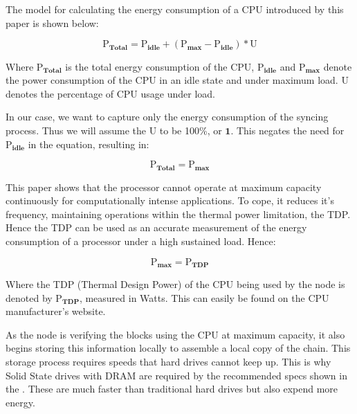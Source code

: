 The model for calculating the energy consumption of a CPU introduced by this paper \cite{SaingreUnderstandingContracts} is shown below:

\begin{equation*}
    \boldsymbol{\mathrm{P}_{Total} = \mathrm{P}_{idle} + \left({\mathrm{P}_{max} - \mathrm{P}_{idle}}\right) * \mathrm{U}}
\end{equation*}

Where $\boldsymbol{\mathrm{P}_{Total}}$ is the total energy consumption of the CPU, $\boldsymbol{\mathrm{P}_{idle}}$ and $\boldsymbol{\mathrm{P}_{max}}$ denote the power consumption of the CPU in an idle state and under maximum load. $\boldsymbol{\mathrm{U}}$ denotes the percentage of CPU usage under load.

In our case, we want to capture only the energy consumption of the syncing process. Thus we will assume the $\boldsymbol{\mathrm{U}}$ to be 100\%, or $\boldsymbol{1}$. This negates the need for $\boldsymbol{\mathrm{P}_{idle}}$ in the equation, resulting in:

\begin{equation*}
    \boldsymbol{\mathrm{P}_{Total} = {\mathrm{P}_{max}}}
\end{equation*}

This paper \cite{Schuchart2016TheScale} shows that the processor cannot operate at maximum capacity continuously for computationally intense applications. To cope, it reduces it's frequency, maintaining operations within the thermal power limitation, the TDP. Hence the TDP can be used as an accurate measurement of the energy consumption of a processor under a high sustained load. Hence:

\begin{equation*}
    \boldsymbol{\mathrm{P}_{max} = {\mathrm{P}_{TDP}}}
\end{equation*}

Where the TDP (Thermal Design Power) of the CPU being used by the node is denoted by $\boldsymbol{\mathrm{P}_{TDP}}$, measured in Watts. This can easily be found on the CPU manufacturer's website.

 As the node is verifying the blocks using the CPU at maximum capacity, it also begins storing this information locally to assemble a local copy of the chain. This storage process requires speeds that hard drives cannot keep up. This is why Solid State drives with DRAM are required by the recommended specs shown in the . These are much faster than traditional hard drives but also expend more energy. 

